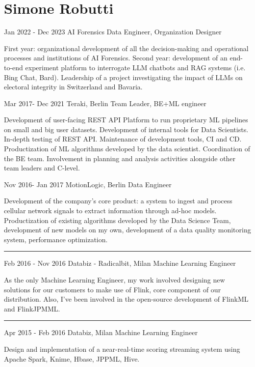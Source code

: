 \documentclass{tccv}
\begin{document}
\part{Simone Robutti}

\begin{eventlist}

\item{Jan 2022 - Dec 2023}
     {AI Forensics}
     {Data Engineer, Organization Designer}

First year: organizational development of all the decision-making and operational processes and institutions of AI Forensics. Second year: development of an end-to-end experiment platform to interrogate LLM chatbots and RAG systems (i.e. Bing Chat, Bard). Leadership of a project investigating the impact of LLMs on electoral integrity in Switzerland and Bavaria.

\item{Mar 2017- Dec 2021}
     {Teraki, Berlin}
     {Team Leader, BE+ML engineer}

Development of user-facing REST API Platform to run proprietary ML pipelines on small and big user datasets. Development of internal tools for Data Scientists. In-depth testing of REST API. Maintenance of development tools, CI and CD. Productization of ML algorithms developed by the data scientist. Coordination of the BE team. Involvement in planning and analysis activities alongside other team leaders and C-level.


\item{Nov 2016- Jan 2017}
     {MotionLogic, Berlin}
     {Data Engineer}

Development of the company's core product: a system to ingest and process cellular network signals to extract information through ad-hoc models. Productization of existing algorithms developed by the Data Science Team, development of new models on my own, development of a data quality monitoring system, performance optimization.


\noindent\hfil\rule{0.3\textwidth}{.4pt}

\item{Feb 2016 - Nov 2016}
{Databiz - Radicalbit, Milan}
{Machine Learning Engineer}

As the only Machine Learning Engineer, my work involved designing new solutions for our customers to make use of Flink, core component of our distribution. Also, I've been involved in the open-source development of FlinkML and FlinkJPMML.

\noindent\hfil\rule{0.3\textwidth}{.4pt}

\item{Apr 2015 - Feb 2016}
{Databiz, Milan}
{Machine Learning Engineer}

Design and implementation of a near-real-time scoring streaming system using Apache Spark, Knime, Hbase, JPPML, Hive.

\end{eventlist}
\end{document}
